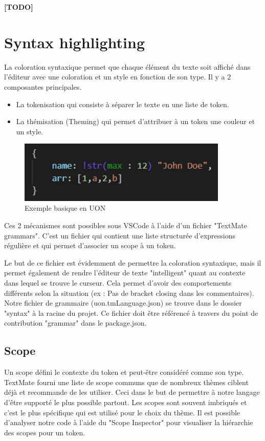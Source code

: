 \documentclass[
    iict, %
    il, %
]{heig-tb}
\begin{document}
\textbf{[TODO]}

\section{Syntax highlighting}
La coloration syntaxique permet que chaque élément du texte soit affiché dans l’éditeur avec une coloration et un style en fonction de son type.
Il y a 2 composantes principales.
\begin{itemize}
    \item La tokenisation qui consiste à séparer le texte en une liste de token.
    \item La thémisation (Theming) qui permet d’attribuer à un token une couleur et un style.
\end{itemize}

\begin{figure}[!ht]
    \begin{center}
        \includegraphics[width=10cm]{assets/figures/basic-uon.png}
    \end{center}
    \caption[code UON]{\label{basic-uon} Exemple basique en UON}
\end{figure}

Ces 2 mécanismes sont possibles sous VSCode à l’aide d’un fichier "TextMate grammars". C’est un fichier qui contient une liste structurée d’expressions régulière et qui permet d’associer un scope à un token.

Le but de ce fichier est évidemment de permettre la coloration syntaxique, mais il permet également de rendre l'éditeur de texte "intelligent" quant au contexte dans lequel se trouve le curseur. Cela permet d’avoir des comportements différents selon la situation (ex : Pas de bracket closing dans les commentaires).
Notre fichier de grammaire (uon.tmLanguage.json) se trouve dans le dossier "syntax" à la racine du projet.
Ce fichier doit être référencé à travers du point de contribution "grammar" dans le package.json.

\subsection{Scope}
Un scope défini le contexte du token et peut-être considéré comme son type.
TextMate fourni une liste de scope communs que de nombreux thèmes ciblent déjà et recommande de les utiliser. Ceci dans le but de permettre à notre langage d’être supporté le plus possible partout. 
Les scopes sont souvent imbriqués et c’est le plus spécifique qui est utilisé pour le choix du thème.
Il est possible d’analyser notre code à l’aide du "Scope Inspector" pour visualiser la hiérarchie des scopes pour un token.
\end{document}
